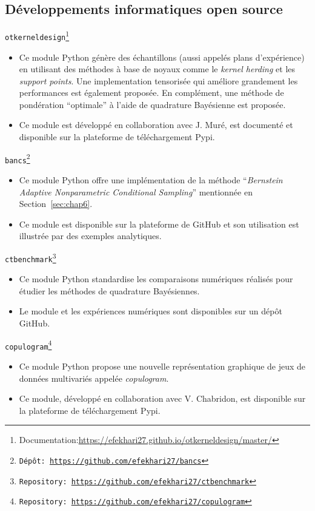 \newpage
\subsection{Développements informatiques open source}

\noindent
\texttt{otkerneldesign}\footnote{Documentation:\url{https://efekhari27.github.io/otkerneldesign/master/}}
\begin{itemize}
    \item[\textbullet] Ce module Python génère des échantillons (aussi appelés plans d'expérience) en utilisant des méthodes à base de noyaux comme le \textit{kernel herding} et les \textit{support points}. Une implementation tensorisée qui améliore grandement les performances est également proposée. En complément, une méthode de pondération ``optimale'' à l'aide de quadrature Bayésienne est proposée. 
    \item[\textbullet] Ce module est développé en collaboration avec J. Muré, est documenté et disponible sur la plateforme de téléchargement Pypi.
\end{itemize}

\noindent
\texttt{bancs\footnote{Dépôt: \url{https://github.com/efekhari27/bancs}}}     
\begin{itemize}
    \item[\textbullet] Ce module Python offre une implémentation de la méthode ``\textit{Bernstein Adaptive Nonparametric Conditional Sampling}'' mentionnée en Section~\ref{sec:chap6}. 
    \item[\textbullet] Ce module est disponible sur la plateforme de GitHub et son utilisation est illustrée par des exemples analytiques.
\end{itemize}

\noindent
\texttt{ctbenchmark\footnote{Repository: \url{https://github.com/efekhari27/ctbenchmark}}}    
\begin{itemize}
    \item[\textbullet] Ce module Python standardise les comparaisons numériques réalisés pour étudier les méthodes de quadrature Bayésiennes.      
    \item[\textbullet] Le module et les expériences numériques sont disponibles sur un dépôt GitHub.
\end{itemize}

\noindent
\texttt{copulogram\footnote{Repository: \url{https://github.com/efekhari27/copulogram}}} 
\begin{itemize}
    \item[\textbullet] Ce module Python propose une nouvelle représentation graphique de jeux de données multivariés appelée \textit{copulogram}.
    \item[\textbullet] Ce module, développé en collaboration avec V. Chabridon, est disponible sur la plateforme de téléchargement Pypi.
\end{itemize}
